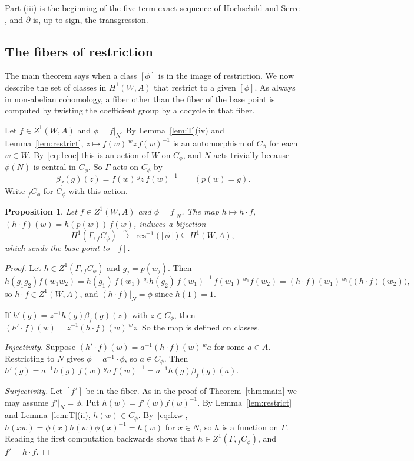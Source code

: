 \documentclass[12pt,letterpaper]{article}
\numberwithin{equation}{section}
\theoremstyle{plain}
\newtheorem{proposition}[theorem]{Proposition}
\theoremstyle{definition}
\newcommand{\act}[2]{{}^{#1}\!#2}          %
\DeclareMathOperator{\res}{res}
\begin{document}
Part (iii) is the beginning of the five-term exact sequence of Hochschild
and Serre \cite{HS53}, and $\partial$ is, up to sign, the transgression.

\subsection{The fibers of restriction}

The main theorem says when a class $[\phi]$ is in the image of
restriction. We now describe the set of classes in $H^1(W,A)$ that
restrict to a given $[\phi]$. As always in non-abelian cohomology, a fiber
other than the fiber of the base point is computed by twisting the
coefficient group by a cocycle in that fiber.

Let $f\in Z^1(W,A)$ and $\phi=f|_N$. By Lemma~\ref{lem:T}(iv) and
Lemma~\ref{lem:restrict}, $z\mapsto f(w)\,\act{w}{z}\,f(w)^{-1}$ is an
automorphism of $C_\phi$ for each $w\in W$. By~\eqref{eq:1coc} this is an
action of $W$ on $C_\phi$, and $N$ acts trivially because $\phi(N)$ is
central in $C_\phi$. So $\Gamma$ acts on $C_\phi$ by
\begin{equation}\label{eq:betaf}
\beta_f(g)(z)=f(w)\,\act{g}{z}\,f(w)^{-1}\qquad(p(w)=g).
\end{equation}
Write ${}_fC_\phi$ for $C_\phi$ with this action.

\begin{proposition}\label{prop:fiber}
Let $f\in Z^1(W,A)$ and $\phi=f|_N$. The map $h\mapsto h\cdot f$,
$(h\cdot f)(w)=h(p(w))\,f(w)$, induces a bijection
\[
H^1(\Gamma,{}_fC_\phi)\ \overset{\sim}{\longrightarrow}\
\res^{-1}\bigl([\phi]\bigr)\subseteq H^1(W,A),
\]
which sends the base point to $[f]$.
\end{proposition}

\begin{proof}
Let $h\in Z^1(\Gamma,{}_fC_\phi)$ and $g_j=p(w_j)$. Then
\[
h(g_1g_2)f(w_1w_2)=h(g_1)\,f(w_1)\,\act{g_1}{h(g_2)}\,f(w_1)^{-1}\,f(w_1)\,
\act{w_1}{f(w_2)}=(h\cdot f)(w_1)\,\act{w_1}{\bigl((h\cdot f)(w_2)\bigr)},
\]
so $h\cdot f\in Z^1(W,A)$, and $(h\cdot f)|_N=\phi$ since $h(1)=1$.

If $h'(g)=z^{-1}h(g)\beta_f(g)(z)$ with $z\in C_\phi$, then
$(h'\cdot f)(w)=z^{-1}(h\cdot f)(w)\,\act{w}{z}$. So the map is defined on
classes.

\emph{Injectivity.} Suppose $(h'\cdot f)(w)=a^{-1}(h\cdot f)(w)\,
\act{w}{a}$ for some $a\in A$. Restricting to $N$ gives
$\phi=a^{-1}\cdot\phi$, so $a\in C_\phi$. Then
$h'(g)=a^{-1}h(g)\,f(w)\,\act{g}{a}\,f(w)^{-1}=a^{-1}h(g)\beta_f(g)(a)$.

\emph{Surjectivity.} Let $[f']$ be in the fiber. As in the proof of
Theorem~\ref{thm:main} we may assume $f'|_N=\phi$. Put
$h(w)=f'(w)f(w)^{-1}$. By Lemma~\ref{lem:restrict} and
Lemma~\ref{lem:T}(ii), $h(w)\in C_\phi$. By~\eqref{eq:fxw},
$h(xw)=\phi(x)h(w)\phi(x)^{-1}=h(w)$ for $x\in N$, so $h$ is a function on
$\Gamma$. Reading the first computation backwards shows that
$h\in Z^1(\Gamma,{}_fC_\phi)$, and $f'=h\cdot f$.
\end{proof}
\end{document}
